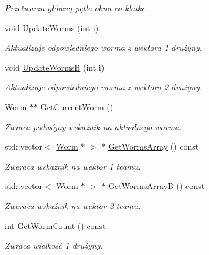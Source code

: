 \begin{DoxyCompactItemize}
\begin{DoxyCompactList}\small\item\em Przetwarza główną pętle okna co klatke. \end{DoxyCompactList}\item 
void \mbox{\hyperlink{class_game_window_a043804fa483c8ea2f348b6fb1dac4e4a}{Update\+Worms}} (int i)
\begin{DoxyCompactList}\small\item\em Aktualizuje odpowiedniego worma z wektora 1 drużyny. \end{DoxyCompactList}\item 
void \mbox{\hyperlink{class_game_window_aa6659ccbd2a5d27141eb3f00fdc72ea6}{Update\+WormsB}} (int i)
\begin{DoxyCompactList}\small\item\em Aktualizuje odpowiedniego worma z wektora 2 drużyny. \end{DoxyCompactList}\item 
\mbox{\hyperlink{class_worm}{Worm}} $\ast$$\ast$ \mbox{\hyperlink{class_game_window_a172c7184152f5c49a5089205ae3528f5}{Get\+Current\+Worm}} ()
\begin{DoxyCompactList}\small\item\em Zwraca podwójny wskaźnik na aktualnego worma. \end{DoxyCompactList}\item 
std\+::vector$<$ \mbox{\hyperlink{class_worm}{Worm}} $\ast$ $>$ $\ast$ \mbox{\hyperlink{class_game_window_a7535403f5d3ab3ffe22c711665102052}{Get\+Worms\+Array}} () const
\begin{DoxyCompactList}\small\item\em Zweraca wskaźnik na wektor 1 team\textquotesingle{}u. \end{DoxyCompactList}\item 
std\+::vector$<$ \mbox{\hyperlink{class_worm}{Worm}} $\ast$ $>$ $\ast$ \mbox{\hyperlink{class_game_window_ab9695e10e5a991a9df920911402b9272}{Get\+Worms\+ArrayB}} () const
\begin{DoxyCompactList}\small\item\em Zweraca wskaźnik na wektor 2 team\textquotesingle{}u. \end{DoxyCompactList}\item 
int \mbox{\hyperlink{class_game_window_acfef11596afd262e0e4e77051ed24cde}{Get\+Worm\+Count}} () const
\begin{DoxyCompactList}\small\item\em Zwraca wielkość 1 drużyny. \end{DoxyCompactList}\item 
$$
\end{DoxyCompactItemize}
